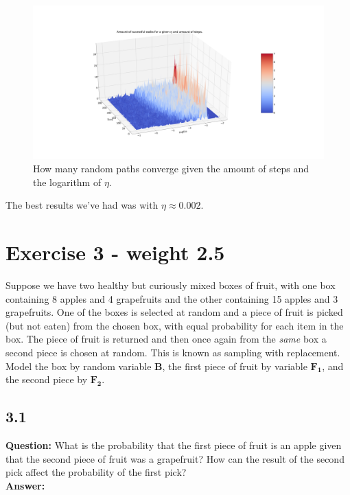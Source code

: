 \documentclass[a4paper]{article}
\begin{document}
\begin{figure}[H]
\hspace*{-6cm}
\includegraphics[width=1.5\textwidth]{Images/3dError.png}
\caption{How many random paths converge given the amount of steps and the logarithm of $\eta$.}
\end{figure}

The best results we've had was with  $\eta \approx 0.002$.


\section*{Exercise 3 - weight 2.5}


Suppose we have two healthy but curiously mixed boxes of fruit, with one box containing 8 apples and 4 grapefruits and the other containing 15 apples and 3 grapefruits. One of the boxes is selected at random and a piece of fruit is picked (but not eaten) from the chosen box, with equal probability for each item in the box. The piece of fruit is returned and then once again from the \textit{same} box a second piece is chosen at random. This is known as sampling with replacement. Model the box by random variable $\boldsymbol{B}$, the first piece of fruit by variable $\boldsymbol{F_1}$, and the second piece by $\boldsymbol{F_2}$.


\subsection*{3.1}

\textbf{Question:} What is the probability that the first piece of fruit is an apple given that the second piece of fruit was a grapefruit? How can the result of the second pick affect the probability of the first pick?\\

\textbf{Answer:}\\
\end{document}
